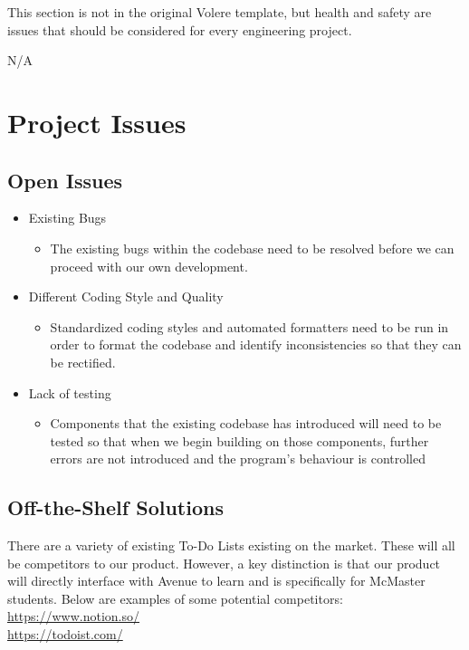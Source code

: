 \documentclass[12pt, titlepage]{article}
\begin{document}
This section is not in the original Volere template, but health and safety are
issues that should be considered for every engineering project.

\noindent N/A 

\section{Project Issues}

\subsection{Open Issues}

\begin{itemize}
\item Existing Bugs
	\begin{itemize}
	\item The existing bugs within the codebase need to be resolved before we can proceed with our own development.
	\end{itemize}
\item Different Coding Style and Quality
	\begin{itemize}
	\item Standardized coding styles and automated formatters need to be run in order to format the codebase and identify inconsistencies so that they can be rectified.
	\end{itemize}
\item Lack of testing
	\begin{itemize}
	\item Components that the existing codebase has introduced will need to be tested so that when we begin building on those components, further errors are not introduced and the program’s behaviour is controlled
	\end{itemize}
\end{itemize}
\subsection{Off-the-Shelf Solutions}

There are a variety of existing To-Do Lists existing on the market. These will all be competitors to our product. However, a key distinction is that our product will directly interface with Avenue to learn and is specifically for McMaster students. Below are examples of some potential competitors:\\
\url{https://www.notion.so/}\\
\url{https://todoist.com/}
\end{document}
